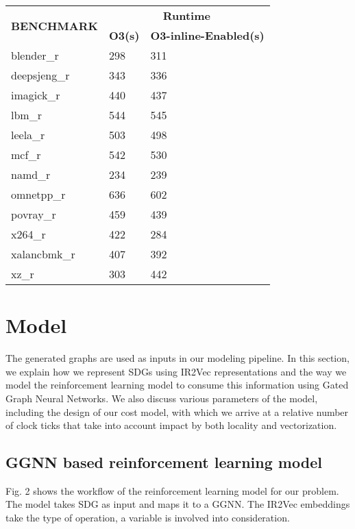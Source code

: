 \begin{table}[h]
\begin{tabular}{lll}
\multirow{2}{*}{\textbf{BENCHMARK}} & \multicolumn{2}{c}{\textbf{Runtime}} \\
 & \textbf{O3(s)} & \textbf{O3-inline-Enabled(s)} \\
blender\_r & 298 & 311 \\
deepsjeng\_r & 343 & 336 \\
imagick\_r & 440 & 437 \\
lbm\_r & 544 & 545 \\
leela\_r & 503 & 498 \\
mcf\_r & 542 & 530 \\
namd\_r & 234 & 239 \\
omnetpp\_r & 636 & 602 \\
povray\_r & 459 & 439 \\
x264\_r & 422 & 284 \\
xalancbmk\_r & 407 & 392 \\
xz\_r & 303 & 442
\end{tabular}
\centering
\end{table}

\section{Model}
 The generated graphs are used as inputs in our modeling pipeline. In this section, we explain how we represent SDGs using IR2Vec representations and the way we model the reinforcement learning model to consume this information using Gated Graph Neural Networks. We also discuss various parameters of the model, including the design of our cost model, with which we arrive at a relative number of clock ticks that take into account impact by both locality and vectorization.


\subsection{GGNN based reinforcement learning model}
    Fig. 2 shows the workflow of the reinforcement learning model for our problem. The model takes SDG as input and maps it to a GGNN. The IR2Vec embeddings take the type of operation, a variable is involved into consideration.


